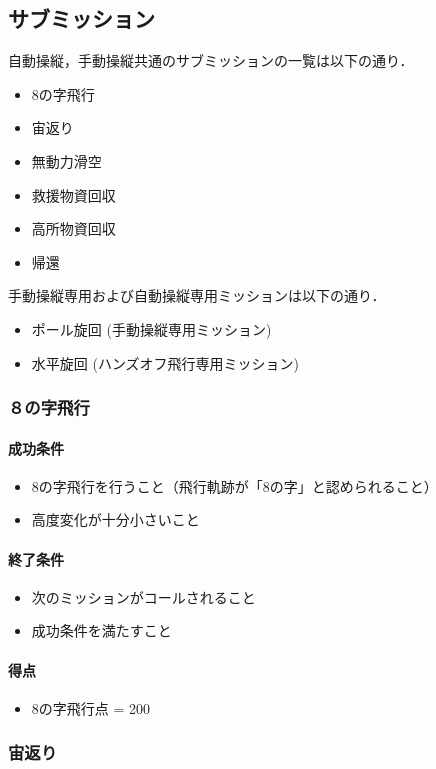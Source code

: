 \subsection{サブミッション}
自動操縦，手動操縦共通のサブミッションの一覧は以下の通り．
\begin{itemize}
\item 8の字飛行
\item 宙返り
\item 無動力滑空
\item 救援物資回収
\item 高所物資回収
\item 帰還
\end{itemize}

手動操縦専用および自動操縦専用ミッションは以下の通り．
\begin{itemize}
\item ポール旋回 (手動操縦専用ミッション)
\item 水平旋回 (ハンズオフ飛行専用ミッション)
\end{itemize}

\subsubsection{８の字飛行}
\paragraph{成功条件}
\begin{itemize}
\item 8の字飛行を行うこと（飛行軌跡が「8の字」と認められること）
\item 高度変化が十分小さいこと
\end{itemize}
\paragraph{終了条件}
\begin{itemize}
\item 次のミッションがコールされること
\item 成功条件を満たすこと
\end{itemize}
\paragraph{得点}
\begin{itemize}
\item 8の字飛行点 = 200
\end{itemize}
\subsubsection{宙返り}
